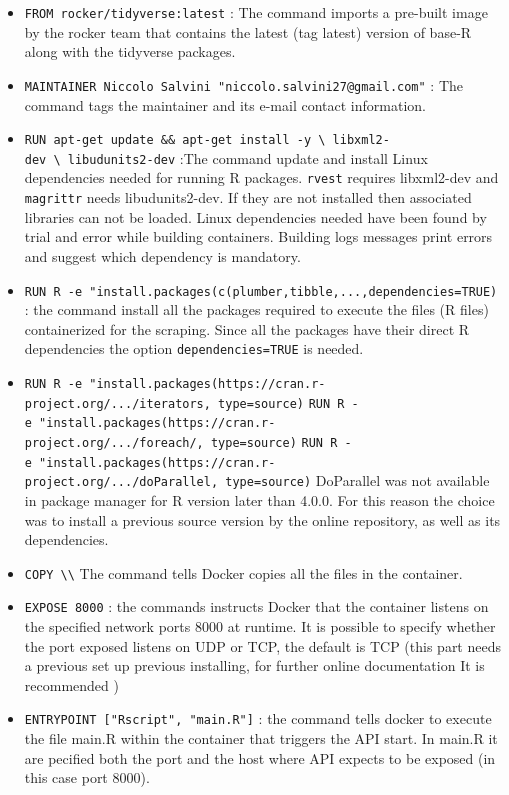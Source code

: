 \documentclass[
  12pt,
  a4paper,
  oneside]{book}
\theoremstyle{definition}
\theoremstyle{definition}
\theoremstyle{definition}
\theoremstyle{remark}
\begin{document}
\begin{itemize}
\item
  \texttt{FROM\ rocker/tidyverse:latest} : The command imports a pre-built image by the rocker team that contains the latest (tag latest) version of base-R along with the tidyverse packages.
\item
  \texttt{MAINTAINER\ Niccolo\ Salvini\ "niccolo.salvini27@gmail.com"} : The command tags the maintainer and its e-mail contact information.
\item
  \texttt{RUN\ apt-get\ update\ \&\&\ apt-get\ install\ -y\ \textbackslash{}\ libxml2-dev\ \textbackslash{}\ libudunits2-dev} :The command update and install Linux dependencies needed for running R packages. \texttt{rvest} requires libxml2-dev and \texttt{magrittr} needs libudunits2-dev. If they are not installed then associated libraries can not be loaded. Linux dependencies needed have been found by trial and error while building containers. Building logs messages print errors and suggest which dependency is mandatory.
\item
  \texttt{RUN\ R\ -e\ "install.packages(c(\textquotesingle{}plumber\textquotesingle{},\textquotesingle{}tibble\textquotesingle{},\textquotesingle{}...\textquotesingle{},dependencies=TRUE)} : the command install all the packages required to execute the files (R files) containerized for the scraping. Since all the packages have their direct R dependencies the option \texttt{dependencies=TRUE} is needed.
\item
  \texttt{RUN\ R\ -e\ "install.packages(\textquotesingle{}https://cran.r-project.org/.../iterators,\ type=\textquotesingle{}source\textquotesingle{})}
  \texttt{RUN\ R\ -e\ "install.packages(\textquotesingle{}https://cran.r-project.org/.../foreach/,\ type=\textquotesingle{}source\textquotesingle{})}
  \texttt{RUN\ R\ -e\ "install.packages(\textquotesingle{}https://cran.r-project.org/.../doParallel,\ type=\textquotesingle{}source\textquotesingle{})}
  DoParallel was not available in package manager for R version later than 4.0.0. For this reason the choice was to install a previous source version by the online repository, as well as its dependencies.
\item
  \texttt{COPY\ \textbackslash{}\textbackslash{}} The command tells Docker copies all the files in the container.
\item
  \texttt{EXPOSE\ 8000} : the commands instructs Docker that the container listens on the specified network ports 8000 at runtime. It is possible to specify whether the port exposed listens on UDP or TCP, the default is TCP (this part needs a previous set up previous installing, for further online documentation It is recommended \citep{docker_documentation_2020} )
\item
  \texttt{ENTRYPOINT\ {[}"Rscript",\ "main.R"{]}} : the command tells docker to execute the file main.R within the container that triggers the API start. In main.R it are pecified both the port and the host where API expects to be exposed (in this case port 8000).
\end{itemize}
\end{document}
